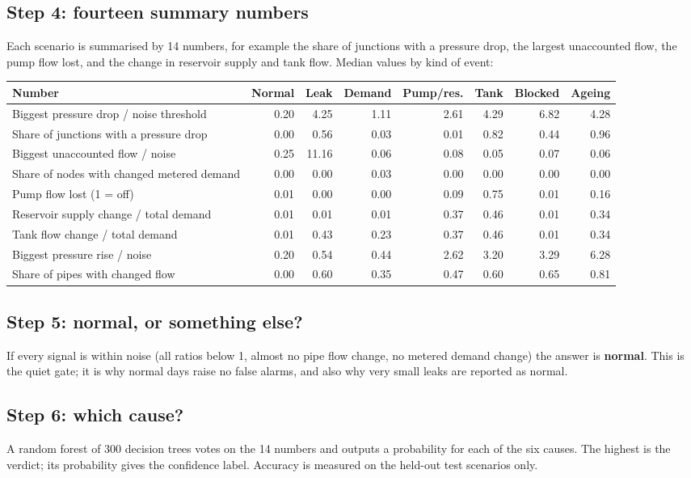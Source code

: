 \documentclass[11pt,a4paper]{article}
\newcommand{\term}[1]{\textbf{#1}}
\begin{document}
\subsection{Step 4: fourteen summary numbers}
Each scenario is summarised by 14 numbers, for example the share of junctions with a pressure drop, the largest unaccounted flow, the pump flow lost, and the change in reservoir supply and tank flow. Median values by kind of event:
{\small\begin{center}\begin{tabular}{@{}p{5.6cm}rrrrrrr@{}}
\toprule
Number & Normal & Leak & Demand & Pump/res. & Tank & Blocked & Ageing \\
\midrule
Biggest pressure drop / noise threshold & 0.20 & 4.25 & 1.11 & 2.61 & 4.29 & 6.82 & 4.28 \\
Share of junctions with a pressure drop & 0.00 & 0.56 & 0.03 & 0.01 & 0.82 & 0.44 & 0.96 \\
Biggest unaccounted flow / noise & 0.25 & 11.16 & 0.06 & 0.08 & 0.05 & 0.07 & 0.06 \\
Share of nodes with changed metered demand & 0.00 & 0.00 & 0.03 & 0.00 & 0.00 & 0.00 & 0.00 \\
Pump flow lost (1 = off) & 0.01 & 0.00 & 0.00 & 0.09 & 0.75 & 0.01 & 0.16 \\
Reservoir supply change / total demand & 0.01 & 0.01 & 0.01 & 0.37 & 0.46 & 0.01 & 0.34 \\
Tank flow change / total demand & 0.01 & 0.43 & 0.23 & 0.37 & 0.46 & 0.01 & 0.34 \\
Biggest pressure rise / noise & 0.20 & 0.54 & 0.44 & 2.62 & 3.20 & 3.29 & 6.28 \\
Share of pipes with changed flow & 0.00 & 0.60 & 0.35 & 0.47 & 0.60 & 0.65 & 0.81 \\
\bottomrule
\end{tabular}\end{center}}

\subsection{Step 5: normal, or something else?}
If every signal is within noise (all ratios below 1, almost no pipe flow change, no metered demand change) the answer is \term{normal}. This is the quiet gate; it is why normal days raise no false alarms, and also why very small leaks are reported as normal.

\subsection{Step 6: which cause?}
A random forest of 300 decision trees votes on the 14 numbers and outputs a probability for each of the six causes. The highest is the verdict; its probability gives the confidence label. Accuracy is measured on the held-out test scenarios only.
\end{document}
